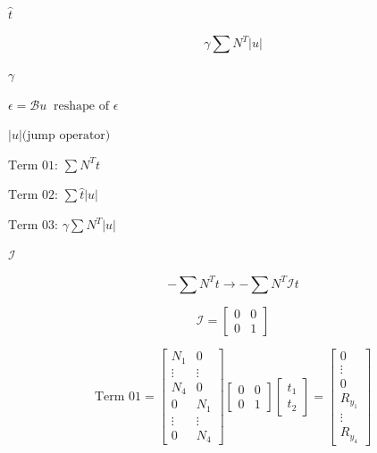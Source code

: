\documentclass{article}
\begin{document}
$ \hat{t} $
\pagebreak

\[
\gamma \sum N^T \left| u \right|
\]
\pagebreak

$ \gamma $
\pagebreak

$ \epsilon = \mathcal{B} u \;\; \mbox{reshape of }\epsilon $
\pagebreak

$ \left| u \right| \mbox{(jump operator)} $
\pagebreak

$ \mbox{Term 01: } \sum N^T t $
\pagebreak

$ \mbox{Term 02: } \sum \hat{t} \left| u \right| $
\pagebreak

$ \mbox{Term 03: } \gamma \sum N^T \left| u \right| $
\pagebreak

$ \mathcal{I} $
\pagebreak

\[
-\sum N^T t \to -\sum N^T \mathcal{I} t
\]
\pagebreak

\[
\mathcal{I} = \begin{bmatrix}
                0   &   0   \\
                0   &   1
              \end{bmatrix}
\]
\pagebreak

\[
\mbox{Term 01} = \begin{bmatrix}
                 N_1        &   0       \\
                 \vdots &   \vdots  \\
                 N_4        &   0       \\
                 0      &   N_1     \\
                 \vdots &   \vdots  \\
                 0      &   N_4
                 \end{bmatrix}
                 \begin{bmatrix}
                 0  &   0   \\
                 0  &   1   
                 \end{bmatrix}
                 \begin{bmatrix}
                 t_1    \\
                 t_2
                 \end{bmatrix}
                 =
                 \begin{bmatrix}
                 0  \\
                 \vdots \\
                 0  \\
                 R_{y_1}    \\
                 \vdots \\
                 R_{y_4}
                 \end{bmatrix}  
\]
\pagebreak
\end{document}
